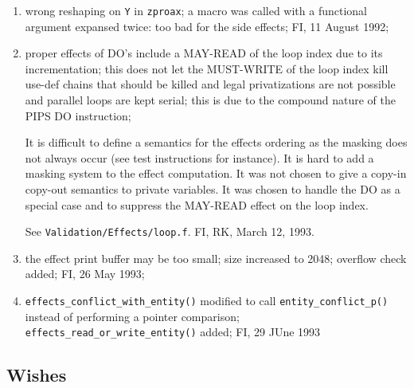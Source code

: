 \begin{enumerate}
  \item wrong reshaping on \verb+Y+ in \verb+zproax+; a macro was
        called with a functional argument expansed twice: too bad
        for the side effects; FI, 11 August 1992;

  \item proper effects of DO's include a MAY-READ of the loop index
        due to its incrementation; this does not let the MUST-WRITE
        of the loop index kill use-def chains that should be killed
        and legal privatizations are not possible and parallel loops
        are kept serial; this is due to the compound nature of the PIPS DO
        instruction;

        It is difficult to define a semantics for the effects ordering
        as the masking does not always occur (see test instructions for
instance).
        It is hard to add a masking system to the effect computation.
        It was not chosen to give a copy-in copy-out semantics to
        private variables.
        It was chosen to handle the DO as a special case and to
        suppress the MAY-READ effect on the loop index.

        See \verb+Validation/Effects/loop.f+. FI, RK, March 12, 1993.

  \item the effect print buffer may be too small; size increased to
        2048; overflow check added; FI, 26 May 1993;

  \item \verb+effects_conflict_with_entity()+ modified to call
        \verb+entity_conflict_p()+ instead of performing a pointer
        comparison; \verb+effects_read_or_write_entity()+ added;
        FI, 29 JUne 1993
        
\end{enumerate}

\subsection{Wishes}

